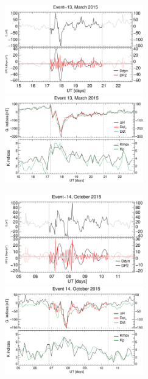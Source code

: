 \documentclass[a4paper,fleqn]{cas-dc}
\begin{document}
\begin{figure}[h!]
       \centerline{\Large \bf   
      \hspace{0.275\textwidth}  \color{black}{}
       \hspace{0.295\textwidth}  \color{black}{}
         \hfill}
	\includegraphics[width=6.0cm]{images/diono/iono_PI_V1_2015-03-15.eps}    
    \includegraphics[width=6.0cm]{images/dH_approx/diono_valid_V4_2015-03-15.eps}     
       \centerline{\Large \bf   
      \hspace{0.275\textwidth}  \color{black}{}
       \hspace{0.295\textwidth}  \color{black}{}
         \hfill}   
	\includegraphics[width=6.0cm]{images/diono/iono_PI_V1_2015-10-05.eps}
    \includegraphics[width=6.0cm]{images/dH_approx/diono_valid_V4_2015-10-05.eps}
    

\end{figure}
\end{document}
